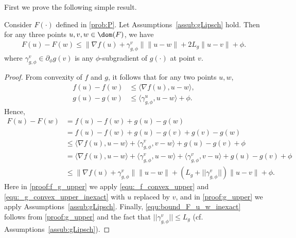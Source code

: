 \documentclass[11pt]{article}
\numberwithin{equation}{section}
\begin{document}
First we prove the following simple result.
\begin{lemma}
Consider $F(\cdot)$ defined in \eqref{prob:P}. Let Assumptions~\ref{assub:gLipsch} hold. Then for any three points $u, v, w \in \dom(F)$, we have
\begin{align}
	\label{equ:bound_F_u_w_inexact}
    F(u) - F(w) 
    \leq 
    \|\nabla f(u)+\gamma_{g, \phi}^v\|\|u-w\| + 2L_g \|u-v\| + \phi.
\end{align}
where $\gamma_{g, \phi}^v \in \partial_{\phi} g(v)$ is any $\phi$-subgradient of $g(\cdot)$ at point $v$.
\end{lemma}
\begin{proof}
	From convexity of $f$ and $g$, it follows that for any two points $u, w$,
	\begin{align}
		\label{equ:_f_convex_upper}
	    f(u) - f(w) &\leq \langle \nabla f(u), u-w \rangle, \\
	    \label{equ:_g_convex_upper_inexact}
	    g(u) - g(w) &\leq \langle \gamma_{g, \phi}^u, u-w \rangle + \phi.
	\end{align}
	Hence,
	\begin{align}
	    \nonumber
	    F(u)-F(w)
	    &=f(u)-f(w)+g(u)-g(w) \\
	    \nonumber
	    &=f(u)-f(w)+g(u)-g(v)+g(v)-g(w) \\
	    \label{proof:f_g_upper}
	    &\leq \langle \nabla f(u), u-w \rangle
	    +\langle \gamma_{g, \phi}^v, v-w \rangle 
	    +g(u)-g(v) 
	    + \phi\\
	    \nonumber
	    &= \langle \nabla f(u), u-w \rangle
	    +\langle \gamma_{g, \phi}^v, u-w \rangle 
	    +\langle \gamma_{g, \phi}^v, v-u \rangle 
	    +g(u)-g(v)
	    + \phi\\
	    \label{proof:g_upper}
	    &\leq \|\nabla f(u)+\gamma_{g, \phi}^v\|\|u-w\| 
	    + (L_g + ||\gamma_{g, \phi}^v||) \|u-v\|+ \phi. 
	\end{align}
	Here in \eqref{proof:f_g_upper} we apply \eqref{equ:_f_convex_upper} and \eqref{equ:_g_convex_upper_inexact} with $u$ replaced by $v$, and in \eqref{proof:g_upper} we apply Assumptions~\ref{assub:gLipsch}. Finally, \eqref{equ:bound_F_u_w_inexact} follows from \eqref{proof:g_upper} and the fact that $||\gamma_{g, \phi}^v|| \leq L_g$ (cf. Assumptions~\ref{assub:gLipsch}).
\end{proof}
\end{document}
